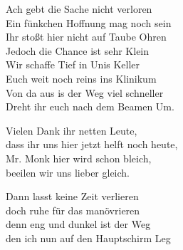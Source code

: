 \begin{verseplay}[10em]
\s{\Paul} Ach gebt die Sache nicht verloren\\
Ein fünkchen Hoffnung mag noch sein\\
Ihr stoßt hier nicht auf Taube Ohren\\
Jedoch die Chance ist sehr Klein\\
Wir schaffe Tief in Unis Keller\\
Euch weit noch reins ins Klinikum\\
Von da aus is der Weg viel schneller\\
Dreht ihr euch nach dem Beamen Um.

\s{\Frodo} Vielen Dank ihr netten Leute,\\
dass ihr uns hier jetzt helft noch heute,\\
Mr. Monk hier wird schon bleich,\\
beeilen wir uns lieber gleich.

\s{\Paul} Dann lasst keine Zeit verlieren\\
doch ruhe für das manövrieren\\
denn eng und dunkel ist der Weg\\
den ich nun auf den Hauptschirm Leg 

\end{verseplay}

